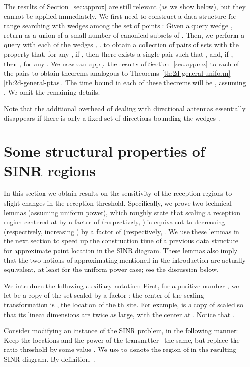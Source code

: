 \documentclass[11pt]{article}
\theoremstyle{remark}
\begin{document}
The results of Section~\ref{sec:approx} are still relevant (as we show below), but they cannot be applied immediately.  We first need to construct a data structure for range searching with wedges among the set of  points :  Given a query wedge , return  as a union of a small number of canonical subsets of . Then, we perform a query with each of the wedges , , to obtain a collection of pairs of sets  with the property that,
for any , if , then there exists a single pair  such that , and, if , then , for any . We now can apply the results of Section~\ref{sec:approx} to each of the pairs  to obtain theorems analogous to Theorems~\ref{th:2d-general-uniform}--\ref{th:2d-general-ptas}. The time bound in each of these theorems will be , assuming . We omit the remaining details.  

Note that the additional overhead of dealing with directional antennas essentially disappears if there is only a fixed set of directions bounding the wedges .






\section{Some structural properties of SINR regions}
\label{sec:structural}

In this section we obtain results on the sensitivity of the reception regions to slight changes in the reception threshold. Specifically, we prove two technical lemmas (assuming uniform power), which roughly state that scaling a reception region  centered at  by a factor of  (respectively, ) is equivalent to decreasing  (respectively, increasing ) by a factor of  (respectively, . We use these lemmas in the next section to speed up the construction time of a previous data structure for approximate point location in the SINR diagram. These lemmas also imply that the two notions of approximating  mentioned in the introduction are actually equivalent, at least for the uniform power case; see the discussion below.

We introduce the following auxiliary notation: First, for a positive number , we let  be a copy of the set  scaled by a factor ; the center of the scaling transformation is , the location of the th site.  For example,  is a copy of  scaled so that its linear dimensions are twice as large, with the center at . Notice that . 

Consider modifying an instance of the SINR problem, in the following manner: Keep the locations and the power of the transmitter~ the same, but replace the ratio threshold  by some value .  We use  to denote the region of  in the resulting SINR diagram.  By definition, .
\end{document}

